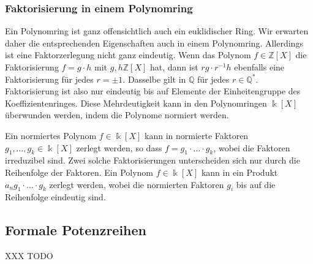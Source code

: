 \subsubsection{Faktorisierung in einem Polynomring}
Ein Polynomring ist ganz offensichtlich auch ein euklidischer Ring.
Wir erwarten daher die entsprechenden Eigenschaften auch in einem
Polynomring.
Allerdings ist eine Faktorzerlegung nicht ganz eindeutig.
Wenn das Polynom $f\in\mathbb{Z}[X]$ die Faktorisierung
$f=g\cdot h$ mit $g,h\mathbb{Z}[X]$ hat, dann
ist $rg\cdot r^{-1}h$ ebenfalls eine Faktorisierung für jedes $r =\pm1$.
Dasselbe gilt in $\mathbb{Q}$ für jedes $r\in \mathbb{Q}^*$.
Faktorisierung ist also nur eindeutig bis auf Elemente der
Einheitengruppe des Koeffizientenringes.
Diese Mehrdeutigkeit kann in den Polynomringen $\Bbbk[X]$ 
überwunden werden, indem die Polynome normiert werden.

\begin{satz}
Ein normiertes Polynom $f\in \Bbbk[X]$ kann in
normierte Faktoren $g_1,\dots,g_k\in\Bbbk[X]$ zerlegt werden, so dass
$f=g_1\cdot\ldots\cdot g_k$, wobei die Faktoren irreduzibel sind.
Zwei solche Faktorisierungen unterscheiden sich nur durch die Reihenfolge
der Faktoren.
Ein Polynom $f\in \Bbbk[X]$ kann in ein Produkt $a_n g_1\cdot\ldots\cdot g_k$
zerlegt werden, wobei die normierten Faktoren $g_i$ bis auf die Reihenfolge
eindeutig sind.
\end{satz}


%
%
\subsection{Formale Potenzreihen
\label{buch:subsection:polynome:potenzreihen}}
XXX TODO



